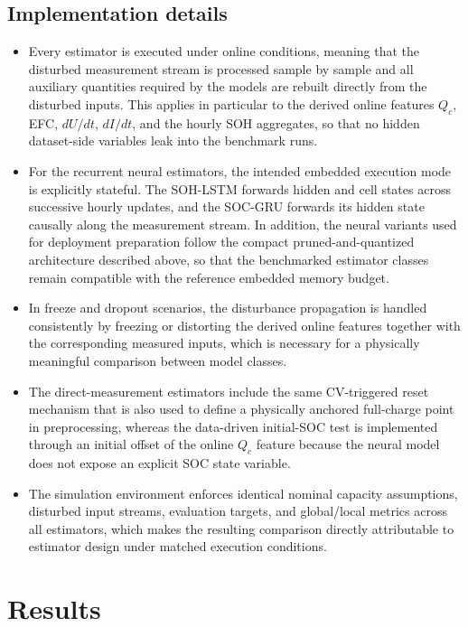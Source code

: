 \documentclass[review,nopreprintline]{elsarticle}
\begin{document}
\subsection{Implementation details}
\begin{itemize}[leftmargin=*]
    \item Every estimator is executed under online conditions, meaning that the disturbed measurement stream is processed sample by sample and all auxiliary quantities required by the models are rebuilt directly from the disturbed inputs. This applies in particular to the derived online features $Q_c$, EFC, $dU/dt$, $dI/dt$, and the hourly SOH aggregates, so that no hidden dataset-side variables leak into the benchmark runs.
    \item For the recurrent neural estimators, the intended embedded execution mode is explicitly stateful. The SOH-LSTM forwards hidden and cell states across successive hourly updates, and the SOC-GRU forwards its hidden state causally along the measurement stream. In addition, the neural variants used for deployment preparation follow the compact pruned-and-quantized architecture described above, so that the benchmarked estimator classes remain compatible with the reference embedded memory budget.
    \item In freeze and dropout scenarios, the disturbance propagation is handled consistently by freezing or distorting the derived online features together with the corresponding measured inputs, which is necessary for a physically meaningful comparison between model classes.
    \item The direct-measurement estimators include the same CV-triggered reset mechanism that is also used to define a physically anchored full-charge point in preprocessing, whereas the data-driven initial-SOC test is implemented through an initial offset of the online $Q_c$ feature because the neural model does not expose an explicit SOC state variable.
    \item The simulation environment enforces identical nominal capacity assumptions, disturbed input streams, evaluation targets, and global/local metrics across all estimators, which makes the resulting comparison directly attributable to estimator design under matched execution conditions.
\end{itemize}

\section{Results}
\end{document}
